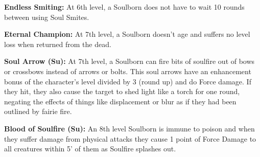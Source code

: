 \textbf{Endless Smiting:} At 6th level, a Soulborn does not have to wait 10 rounds between using Soul Smites.

\textbf{Eternal Champion:} At 7th level, a Soulborn doesn't age and suffers no level loss when returned from the dead.

\textbf{Soul Arrow (Su):} At 7th level, a Soulborn can fire bits of soulfire out of bows or crossbows instead of arrows or bolts. This soul arrows have an enhancement bonus of the character's level divided by 3 (round up) and do Force damage. If they hit, they also cause the target to shed light like a torch for one round, negating the effects of things like displacement or blur as if they had been outlined by fairie fire.

\textbf{Blood of Soulfire (Su):} An 8th level Soulborn is immune to poison and when they suffer damage from physical attacks they cause 1 point of Force Damage to all creatures within 5' of them as Soulfire splashes out.

